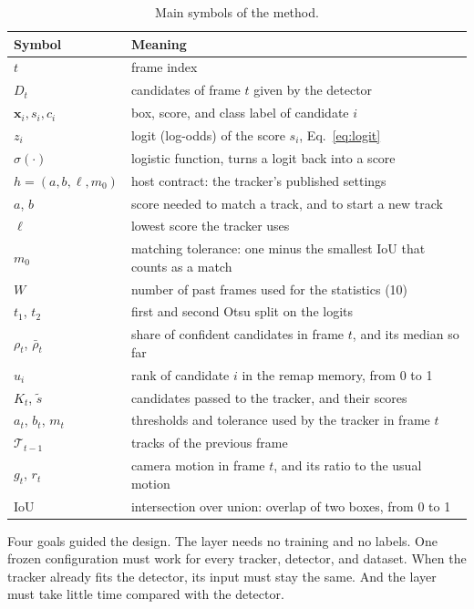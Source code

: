 \documentclass[pdflatex,sn-mathphys-num]{sn-jnl}
\begin{document}
\begin{table}[t]
\caption{Main symbols of the method.}
\label{tab:symbols}
\centering\footnotesize
\begin{tabular}{@{}l>{\raggedright\arraybackslash}p{58mm}@{}}
\toprule
Symbol & Meaning\\
\midrule
$t$ & frame index\\
$D_t$ & candidates of frame $t$ given by the detector\\
$\mathbf{x}_i, s_i, c_i$ & box, score, and class label of candidate $i$\\
$z_i$ & logit (log-odds) of the score $s_i$, Eq.~\eqref{eq:logit}\\
$\sigma(\cdot)$ & logistic function, turns a logit back into a score\\
$h=(a,b,\ell,m_0)$ & host contract: the tracker's published settings\\
$a$, $b$ & score needed to match a track, and to start a new track\\
$\ell$ & lowest score the tracker uses\\
$m_0$ & matching tolerance: one minus the smallest IoU that counts as a match\\
$W$ & number of past frames used for the statistics (10)\\
$t_1$, $t_2$ & first and second Otsu split on the logits\\
$\rho_t$, $\bar\rho_t$ & share of confident candidates in frame $t$, and its median so far\\
$u_i$ & rank of candidate $i$ in the remap memory, from 0 to 1\\
$K_t$, $\tilde{s}$ & candidates passed to the tracker, and their scores\\
$a_t$, $b_t$, $m_t$ & thresholds and tolerance used by the tracker in frame $t$\\
$\mathcal{T}_{t-1}$ & tracks of the previous frame\\
$g_t$, $r_t$ & camera motion in frame $t$, and its ratio to the usual motion\\
IoU & intersection over union: overlap of two boxes, from 0 to 1\\
\bottomrule
\end{tabular}
\end{table}

Four goals guided the design. The layer needs no training and no labels. One
frozen configuration must work for every tracker, detector, and dataset.
When the tracker already fits the detector, its input must stay the same.
And the layer must take little time compared with the detector.
\end{document}
